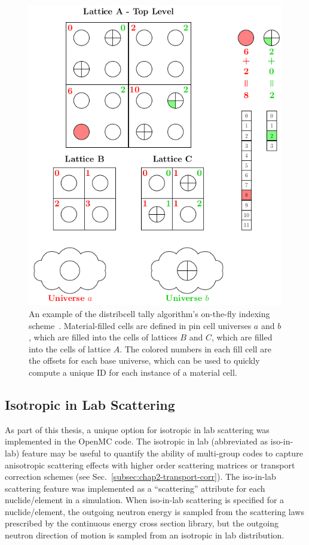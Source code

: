 \begin{figure}
  \centering
  \includegraphics[width=\linewidth]{figures/workflow/openmc/distribcells}
\caption[The distributed cell tally indexing algorithm]{An example of the distribcell tally algorithm's on-the-fly indexing scheme~\cite{lax2014distribcell}. Material-filled cells are defined in pin cell universes $a$ and $b$, which are filled into the cells of lattices $B$ and $C$, which are filled into the cells of lattice $A$.  The colored numbers in each fill cell are the offsets for each base universe, which can be used to quickly compute a unique ID for each instance of a material cell.}
\label{fig:indexing-scheme}
\end{figure}

\subsection{Isotropic in Lab Scattering}
\label{subsec:chap4-iso-in-lab}

As part of this thesis, a unique option for isotropic in lab scattering was implemented in the OpenMC code. The isotropic in lab (abbreviated as iso-in-lab) feature may be useful to quantify the ability of multi-group codes to capture anisotropic scattering effects with higher order scattering matrices or transport correction schemes (see Sec.~\ref{subsec:chap2-transport-corr}). The iso-in-lab scattering feature was implemented as a ``scattering'' attribute for each nuclide/element in a simulation. When iso-in-lab scattering is specified for a nuclide/element, the outgoing neutron energy is sampled from the scattering laws prescribed by the continuous energy cross section library, but the outgoing neutron direction of motion is sampled from an isotropic in lab distribution. 

